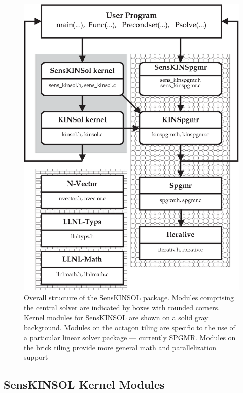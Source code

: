 \documentclass[11pt]{article}
\begin{document}
\begin{figure}
\begin{center}
\includegraphics[width=4.5in]{senskin_struct.eps}
\caption{Overall structure of the SensKINSOL package. Modules comprising
the central solver are indicated by boxes with rounded corners. Kernel
modules for SensKINSOL are shown on a solid gray background. Modules on
the octagon tiling are specific to the use of a particular linear solver
package --- currently SPGMR. Modules on the brick tiling provide more
general math and parallelization support} \label{senskin struct}
\end{center}
\end{figure}

\subsection{SensKINSOL Kernel Modules}
\end{document}

